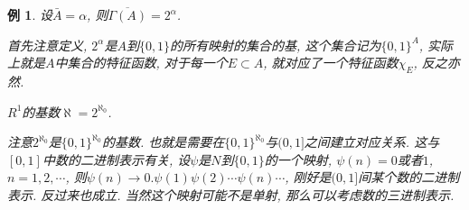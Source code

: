 \documentclass[12pt,a4paper,openany]{book}
\newtheorem{example}{例}
\begin{document}
\begin{example}
设$\bar{A} = \alpha$, 则$\overline{\Gamma(A)} = 2^{\alpha}$.

首先注意定义, $2^{\alpha}$是$A$到$\{0, 1\}$的所有映射的集合的基, 这个集合记为$\{0, 1\}^{A}$, 实际上就是$A$中集合的特征函数, 对于每一个$E \subset A$, 就对应了一个特征函数$\chi_E$, 反之亦然.

$R^1$的基数$\aleph = 2^{\aleph_0}$.

注意$2^{\aleph_0}$是$\{0, 1\}^{\aleph_0}$的基数. 也就是需要在$\{0, 1\}^{\aleph_0}$与$(0, 1]$之间建立对应关系. 这与$[0, 1]$中数的二进制表示有关, 设$\psi$是$N$到$\{0, 1\}$的一个映射, $\psi(n) = 0$或者$1$, $n=1,2, \cdots$, 则$\psi(n) \rightarrow 0.\psi(1)\psi(2)\cdots\psi(n)\cdots$, 刚好是$(0, 1]$间某个数的二进制表示. 反过来也成立. 当然这个映射可能不是单射, 那么可以考虑数的三进制表示.
\end{example}
\end{document}
